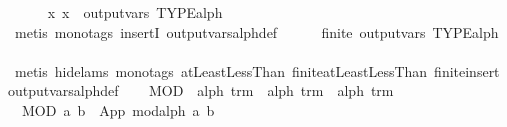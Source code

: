 \begin{isabellebody}
\isanewline
\ \ \ \ \isamarkupfalse%
\ {}{}x{}\ x\ {}\ output{}vars\ TYPE{}alph{}{}\isanewline
\ \ \ \ \ \ \isamarkupfalse%
\ {}metis\ {}mono{}tags{}\ insertI{}\ output{}vars{}alph{}def{}\isanewline
\isanewline
\ \ \ \ \isamarkupfalse%
\ {}finite\ {}output{}vars\ TYPE{}alph{}{}{}\isanewline
\ \ \ \ \ \ \isamarkupfalse%
\ {}metis\ {}hide{}lams{}\ mono{}tags{}\ atLeastLessThan{}\ finite{}atLeastLessThan\ finite{}insert\ output{}vars{}alph{}def{}\isanewline
\ \ \isamarkupfalse%
%
\endisatagproof
{\isafoldproof}%
%
\isadelimproof
%
\endisadelimproof
\isanewline
{}\isamarkupfalse%
\isanewline
\isanewline
{}\isamarkupfalse%
\ MOD\ {}{}\ {}alph\ trm\ {}\ alph\ trm\ {}\ alph\ trm{}\ \isanewline
\ \ {}MOD\ a\ b\ {}\ {}App\ mod{}alph\ {}a{}\ b{}{}{}\isanewline

\end{isabellebody}
